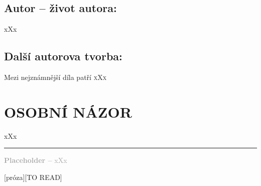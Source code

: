 \documentclass{extarticle} %
\begin{document}
\subsection*{Autor {\ssmall -- život autora:}}
\noindent 
xXx


\subsection*{Další autorova tvorba:}
\noindent 
Mezi nejznámnější díla patří \textsc{xXx}






\section*{OSOBNÍ NÁZOR}
\noindent 
xXx

\vfill

\noindent\begin{minipage}{\textwidth}
    \textcolor{darkgray}{\rule{\linewidth}{0.4pt}
    \footnotesize
    \textbf{Placeholder --} xXx
    }
\end{minipage}

\newpage


\changefontsize{8pt}

[próza][TO READ]
\end{document}
